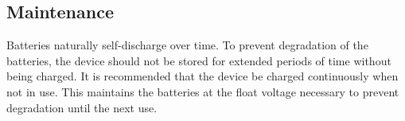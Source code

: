 \documentclass[../jb_user_manual.tex]{subfiles}
\begin{document}
\subsection{Maintenance}

Batteries naturally self-discharge over time.  To prevent degradation of the batteries, the device should not be stored for extended periods of time without being charged.  It is recommended that the device be charged continuously when not in use.  This maintains the batteries at the float voltage necessary to prevent degradation until the next use.

\end{document}
